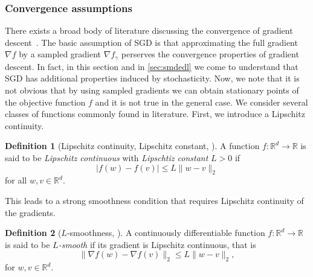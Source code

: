 \documentclass[12pt]{article}
\theoremstyle{definition}
\newtheorem{definition}[definition]{Definition}
\numberwithin{equation}{section}
\newcommand{\R}{\mathbb{R}}
\newcommand{\norm}[1]{\lVert{#1}\rVert_2}
\begin{document}
\subsubsection{Convergence assumptions}
There exists a broad body of literature discussing the convergence of gradient descent~\cite{allen-zhuConvergenceTheoryDeep2019,mertikopoulosAlmostSureConvergence2020,vaswaniFastFasterConvergence2019,gowerSGDGeneralAnalysis2019,liConvergenceStochasticGradient2019,sebbouhAlmostSureConvergence2021,bottouOptimizationMethodsLargeScale2018}. 
The basic assumption of SGD is that approximating the full gradient $\nabla f$ by a sampled gradient $\nabla f_{\gamma}$ perserves the convergence properties of gradient descent.
In fact, in this section and in \autoref{sec:smdedl} we come to understand that SGD has additional properties induced by stochasticity. Now, we note that it is not obvious that by using sampled gradients we can obtain stationary points of the objective function $f$ and it is not true in the general case. We consider several classes of functions commonly found in literature.
First, we introduce a Lipschitz continuity. 
\begin{definition}[Lipschitz continuity, Lipschitz constant, ]
  \label{def:lipschitz_continuity}
  A function $f : \R^d \rightarrow \R$ is said to be \emph{Lipschitz continuous} with \emph{Lipschtiz constant} $L >0$ if
  \begin{equation*}
    |f(w) - f(v)| \leq L \norm{w - v}
  \end{equation*}
  for all $w,v \in \R^d$.
\end{definition}
This leads to a strong smoothness condition that requires Lipschitz continuity of the gradients.
\begin{definition}[$L$-smoothness, ]
  \label{def:l_smooth}
  A continuously differentiable function $f : \mathbb{R}^d \rightarrow \mathbb{R}$ is said to be \emph{$L$-smooth} if its gradient is Lipschitz continuous, that is 
  \begin{equation}
    \norm{\nabla f(w) - \nabla f(v) } \leq L \norm{w-v},
  \end{equation}
  for $w,v \in \mathbb{R}^d$.
\end{definition}
\end{document}
